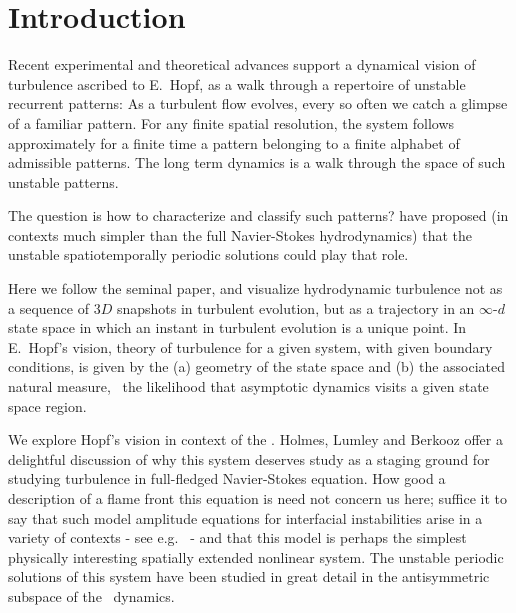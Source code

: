 %

\section{Introduction}

%
Recent experimental and theoretical advances
support a dynamical vision
of turbulence ascribed to E.~Hopf, as a walk through
a repertoire of unstable recurrent patterns:
As a turbulent flow evolves,
every so often we catch a glimpse of a familiar pattern.
For any finite  spatial resolution,
the system follows approximately for a finite time 
a pattern belonging to a 
{ finite alphabet}
of admissible patterns.
The long term dynamics is
a {  walk through the space of such unstable patterns}.

The question is how to characterize and classify such patterns?
 have proposed (in contexts
much simpler than the full Navier-Stokes hydrodynamics) 
that the unstable spatiotemporally periodic
solutions could play that role.

Here we follow the seminal
\cite{hopf48} paper, and  visualize
hydrodynamic turbulence not as  a sequence of 
$3D$  snapshots in turbulent evolution,
but as a trajectory in an 
 $\infty$-$d$ state space in which an
instant in turbulent evolution is
a { unique} point. In E.~Hopf's vision, 
theory of turbulence for a given system, with given boundary conditions,
is given by the
(a) geometry of the state space and (b) the associated natural measure, 
\ie\,
the likelihood that asymptotic dynamics visits a given state space region.

We explore Hopf's vision in context of
the \KSe{}.
Holmes, Lumley
and Berkooz offer a delightful discussion of why this system
deserves study as a staging ground for studying turbulence in 
full-fledged Navier-Stokes equation. 
How good 
a description of a flame front this equation
is need not concern us here; suffice it to say that such model
amplitude equations for interfacial instabilities arise in a variety
of contexts - see e.g.~ - and 
that this model is perhaps the
simplest physically interesting spatially extended nonlinear system.
The unstable periodic solutions of
this system have been studied in great detail%
in the antisymmetric subspace of the \KS\ dynamics.

